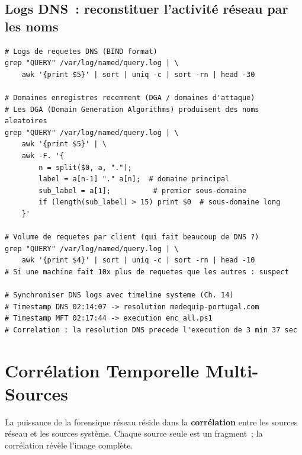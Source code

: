 \subsection{Logs DNS~: reconstituer l'activité réseau par les noms}

\begin{lstlisting}[language=bash_forensique,
    caption={Analyse de logs DNS (BIND / Windows DNS)}]
# Logs de requetes DNS (BIND format)
grep "QUERY" /var/log/named/query.log | \
    awk '{print $5}' | sort | uniq -c | sort -rn | head -30

# Domaines enregistres recemment (DGA / domaines d'attaque)
# Les DGA (Domain Generation Algorithms) produisent des noms aleatoires
grep "QUERY" /var/log/named/query.log | \
    awk '{print $5}' | \
    awk -F. '{
        n = split($0, a, ".");
        label = a[n-1] "." a[n];  # domaine principal
        sub_label = a[1];          # premier sous-domaine
        if (length(sub_label) > 15) print $0  # sous-domaine long
    }'

# Volume de requetes par client (qui fait beaucoup de DNS ?)
grep "QUERY" /var/log/named/query.log | \
    awk '{print $4}' | sort | uniq -c | sort -rn | head -10
# Si une machine fait 10x plus de requetes que les autres : suspect

# Synchroniser DNS logs avec timeline systeme (Ch. 14)
# Timestamp DNS 02:14:07 -> resolution medequip-portugal.com
# Timestamp MFT 02:17:44 -> execution enc_all.ps1
# Correlation : la resolution DNS precede l'execution de 3 min 37 sec
\end{lstlisting}

\section{Corrélation Temporelle Multi-Sources}
\label{sec:correlation-temporelle}

La puissance de la forensique réseau réside dans la \textbf{corrélation}
entre les sources réseau et les sources système. Chaque source seule
est un fragment~; la corrélation révèle l'image complète.

